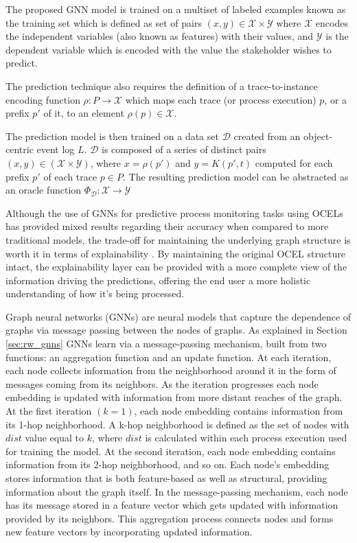         The proposed GNN model is trained on a multiset of labeled examples known as the training set which is defined as set of pairs $(x,y)\in \mathcal{X} \times \mathcal{Y}$ where $\mathcal{X}$ encodes the independent variables (also known as features) with their values, and $\mathcal{Y}$ is the dependent variable which is encoded with the value the stakeholder wishes to predict.

        The prediction technique also requires the definition of a trace-to-instance encoding function $\rho:P \to \mathcal{X}$ which maps each trace (or process execution) $p$, or a prefix $p'$ of it, to an element $\rho(p)\in \mathcal{X}$.

        The prediction model is then trained on a data set $\mathcal{D}$ created from an object-centric event log $L$.
        $\mathcal{D}$ is composed of a series of distinct pairs $(x,y)\in (\mathcal{X} \times \mathcal{Y})$, where $x=\rho(p')$ and $y=K(p',t)$ computed for each prefix $p'$ of each trace $p\in P$. The resulting prediction model can be abstracted as an oracle function $\Phi_{\mathcal{D}}:\mathcal{X} \to \mathcal{Y}$ \cite{galantiDeleoni2024}

        Although the use of GNNs for predictive process monitoring tasks using OCELs has provided mixed results regarding their accuracy when compared to more traditional models, the trade-off for maintaining the underlying graph structure is worth it in terms of explainability \cite{galantiDeleoni2024} \cite{smit2024}. By maintaining the original OCEL structure intact, the explainability layer can be provided with a more complete view of the information driving the predictions, offering the end user a more holistic understanding of how it's being processed.

        Graph neural networks (GNNs) are neural models that capture the dependence of graphs via message passing between the nodes of graphs. As explained in Section \ref{sec:rw_gnns} GNNs learn via a message-passing mechanism, built from two functions: an aggregation function and an update function.
        At each iteration, each node collects information from the neighborhood around it in the form of messages coming from its neighbors. As the iteration progresses each node embedding is updated with information from more distant reaches of the graph. At the first iteration $(k=1)$, each node embedding contains information from its 1-hop neighborhood. A k-hop neighborhood is defined as the set of nodes with $dist$ value equal to $k$, where $dist$ is calculated within each process execution used for training the model. At the second iteration, each node embedding contains information from its 2-hop neighborhood, and so on. Each node's embedding stores information that is both feature-based as well as structural, providing information about the graph itself. 
        In the message-passing mechanism, each node has its message stored in a feature vector which gets updated with information provided by its neighbors. This aggregation process connects nodes and forms new feature vectors by incorporating updated information.

